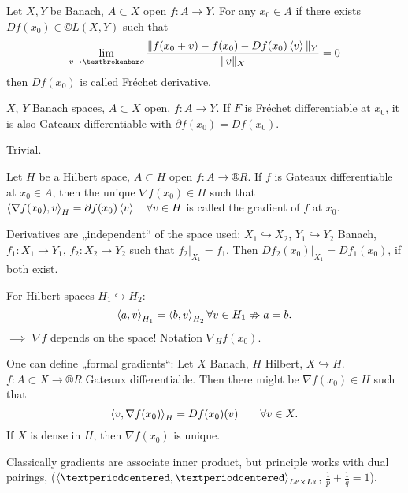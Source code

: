 \documentclass[12pt]{article}					%
\begin{document}
\begin{definice}
	Let $X, Y$ be Banach, $A \subset X$ open $f: A \rightarrow Y$. For any $x_0 \in A$ if there exists $Df(x_0) \in ©L(X, Y)$ such that
	$$ \lim_{v \rightarrow ¦o} \frac{\|f(x_0 + v) - f(x_0) - Df(x_0)\<v\>\|_Y}{\|v\|_X} = 0 $$
	then $Df(x_0)$  is called Fréchet derivative.
\end{definice}

\begin{lemma}
	$X$, $Y$ Banach spaces, $A \subset X$ open, $f: A \rightarrow Y$. If $F$ is Fréchet differentiable at $x_0$, it is also Gateaux differentiable with $\partial f(x_0) = D f(x_0)$.

	\begin{dukazin}
		Trivial.
	\end{dukazin}
\end{lemma}

\begin{definice}[Gradient]
	Let $H$ be a Hilbert space, $A \subset H$ open $f: A \rightarrow ®R$. If $f$ is Gateaux differentiable at $x_0 \in A$, then the unique $\nabla  f(x_0) \in H$ such that $\left\langle\nabla f(x_0), v\right\rangle_H = \partial f(x_0) \left\langle v\right\rangle\quad\forall v \in H$ is called the gradient of $f$ at $x_0$.
\end{definice}

\begin{poznamka}
	Derivatives are „independent“ of the space used: $X_1 \hookrightarrow X_2$, $Y_1 \hookrightarrow Y_2$ Banach, $f_1: X_1 \rightarrow Y_1$, $f_2: X_2 \rightarrow Y_2$ such that $f_2|_{X_1} = f_1$. Then $Df_2(x_0)|_{X_1} = Df_1(x_0)$, if both exist.

	For Hilbert spaces $H_1 \hookrightarrow H_2$:
	$$ \left\langle a, v\right\rangle_{H_1} = \left\langle b, v\right\rangle_{H_2} \forall v \in H_1 \nRightarrow a = b. $$
	$\implies$ $\nabla f$ depends on the space! Notation $\nabla_H f(x_0)$.

	One can define „formal gradients“: Let $X$ Banach, $H$ Hilbert, $X \hookrightarrow H$. $f: A \subset X \rightarrow ®R$ Gateaux differentiable. Then there might be $\nabla f(x_0) \in H$ such that
	$$ \left\langle v, \nabla f(x_0)\right\rangle_H = Df(x_0)(v) \qquad \forall v \in X. $$
	If $X$ is dense in $H$, then $\nabla f(x_0)$ is unique.

	Classically gradients are associate inner product, but principle works with dual pairings, ($\<·, ·\>_{L^p \times L^q}$, $\frac{1}{p} + \frac{1}{q} = 1$).
\end{poznamka}
\end{document}
